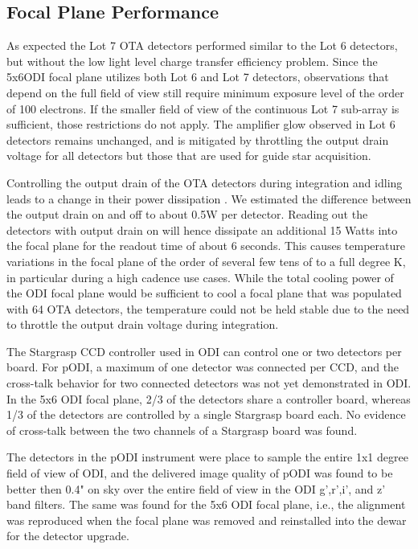 \documentclass[]{spieman}
\begin{document}
\subsection{Focal Plane  Performance}


As expected the Lot 7 OTA detectors performed similar to the Lot 6 detectors,
but without the low light level charge transfer efficiency problem. Since the
5x6ODI focal plane  utilizes  both Lot 6 and Lot 7 detectors, observations that
depend on the full field of view still require minimum exposure level of the
order of 100 electrons. If the smaller field of view of the continuous Lot 7
sub-array is sufficient, those restrictions do not apply. The amplifier glow
observed in Lot 6 detectors remains unchanged, and is mitigated by throttling 
the output drain voltage for all detectors but those that are used for guide
star acquisition.

Controlling the output drain of the OTA detectors during integration and idling
leads to a change in their power dissipation . We estimated the  difference
between the output drain on and off to about 0.5W per detector. Reading out the
detectors with output drain on will hence dissipate an additional 15 Watts into
the focal plane for the readout time of about 6 seconds. This causes temperature
variations in the focal plane of the order of several  few tens of to a full
degree K, in particular during a high cadence use cases. While the total cooling
power of the ODI focal plane would be sufficient to cool a focal plane that was
populated with 64 OTA detectors, the temperature could not be held stable due to
the need to throttle the output drain voltage during integration.


The Stargrasp CCD controller\cite{onaka2008} used in ODI can control one or two
detectors per board. For pODI, a maximum of one detector was connected per CCD,
and the cross-talk behavior for two connected detectors was not yet
demonstrated in ODI. In the 5x6 ODI focal plane, 2/3 of the detectors share a
controller board, whereas 1/3 of the detectors are controlled by a single
Stargrasp board each. No evidence of cross-talk between the two channels of a
Stargrasp board was found.

The detectors in the pODI instrument were place to sample the entire 1x1 degree
field of view of ODI, and the delivered image quality of pODI was found to be
better then 0.4" on sky over the entire field of view in the ODI g',r',i', and
z' band filters. The same was found for the 5x6 ODI focal plane, i.e., the 
alignment was reproduced when the focal plane was removed and reinstalled into
the dewar for the detector upgrade.
\end{document}
